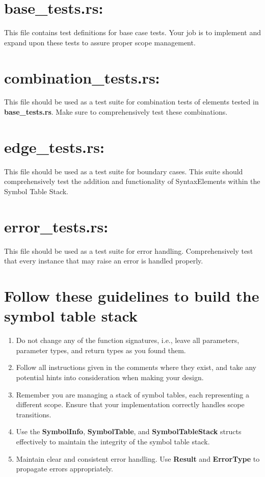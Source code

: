 \documentclass[
	12pt, %
]{fphw}
\begin{document}
\section*{base\_tests.rs:}
This file contains test definitions for base case tests. Your job is to implement and expand upon these tests to assure proper scope management. 

\section*{combination\_tests.rs:}
This file should be used as a test suite for combination tests of elements tested in \textbf{base\_tests.rs}. Make sure to comprehensively test these combinations. 

\section*{edge\_tests.rs:}
This file should be used as a test suite for boundary cases. This suite should comprehensively test the addition and functionality of SyntaxElements within the Symbol Table Stack. 

\section*{error\_tests.rs:}
This file should be used as a test suite for error handling. Comprehensively test that every instance that may raise an error is handled properly. 

\pagebreak

\section*{Follow these guidelines to build the symbol table stack}

\begin{problem}
    \begin{enumerate}
        \item Do not change any of the function signatures, i.e., leave all parameters, parameter types, and return types as you found them.
        \item Follow all instructions given in the comments where they exist, and take any potential hints into consideration when making your design.
        \item Remember you are managing a stack of symbol tables, each representing a different scope. Ensure that your implementation correctly handles scope transitions.
        \item Use the \textbf{SymbolInfo}, \textbf{SymbolTable}, and \textbf{SymbolTableStack} structs effectively to maintain the integrity of the symbol table stack.
        \item Maintain clear and consistent error handling. Use \textbf{Result} and \textbf{ErrorType} to propagate errors appropriately.
    \end{enumerate}
\end{problem}
\end{document}

